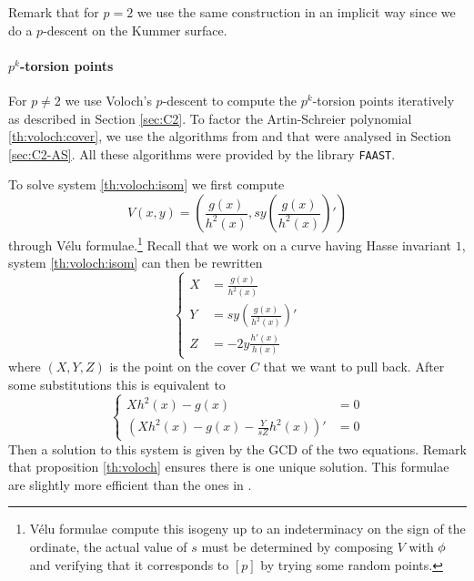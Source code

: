 Remark that for $p=2$ we use the same construction in an implicit way
since we do a $p$-descent on the Kummer surface.


\paragraph{$p^k$-torsion points}
For $p\ne2$ we use Voloch's $p$-descent to compute the $p^k$-torsion
points iteratively as described in Section \ref{sec:C2}. To factor the
Artin-Schreier polynomial \eqref{th:voloch:cover}, we use the
algorithms from \cite{Cou00} and \cite{DFS09} that were analysed in
Section \ref{sec:C2-AS}. All these algorithms were provided by the
library \texttt{FAAST}.

To solve system \eqref{th:voloch:isom} we first compute
\begin{equation*}
  V(x,y) = \left(\frac{g(x)}{h^2(x)}, 
    sy\left(\frac{g(x)}{h^2(x)}\right)'\right)
\end{equation*}
through Vélu formulae.\footnote{Vélu formulae compute this isogeny up
  to an indeterminacy on the sign of the ordinate, the actual value of
  $s$ must be determined by composing $V$ with $\phi$ and
  verifying that it corresponds to $[p]$ by trying some random
  points.} Recall that we work on a curve having Hasse invariant $1$,
system \eqref{th:voloch:isom} can then be rewritten
\begin{equation*}
  \left\{
    \begin{aligned}
      X &= \frac{g(x)}{h^2(x)}\\
      Y &= sy\left(\frac{g(x)}{h^2(x)}\right)'\\
      Z &= -2y\frac{h'(x)}{h(x)}
    \end{aligned}
  \right.
\end{equation*}
where $(X,Y,Z)$ is the point on the cover $C$ that we want to pull
back. After some substitutions this is equivalent to
\begin{equation*}
  \left\{
    \begin{aligned}
      Xh^2(x) - g(x) &= 0\\
      \left(Xh^2(x) - g(x) - \frac{Y}{sZ}h^2(x)\right)' &= 0
    \end{aligned}
  \right.
\end{equation*}
Then a solution to this system is given by the GCD of the two
equations. Remark that proposition \ref{th:voloch} ensures there is
one unique solution. This formulae are slightly more efficient than
the ones in \cite[$\S$6.2]{Ler97}.

